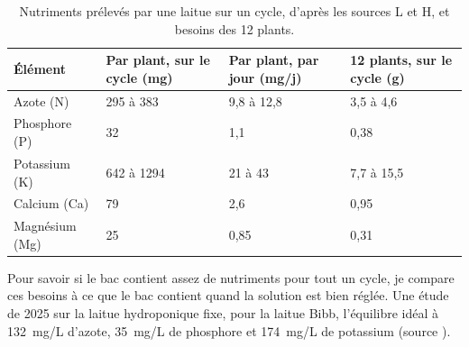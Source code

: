 \begin{table}[H]
\centering
\small
\renewcommand{\arraystretch}{1.1}
\begin{tabularx}{\textwidth}{|>{\raggedright\arraybackslash}p{2.6cm}|Y|Y|Y|}
\hline
\textbf{Élément} & \textbf{Par plant, sur le cycle (\unit{mg})} & \textbf{Par plant, par jour (\unit{mg/j})} & \textbf{12 plants, sur le cycle (\unit{g})} \\
\hline
Azote (N) & 295 à 383 & 9,8 à 12,8 & 3,5 à 4,6 \\
\hline
Phosphore (P) & 32 & 1,1 & 0,38 \\
\hline
Potassium (K) & 642 à 1294 & 21 à 43 & 7,7 à 15,5 \\
\hline
Calcium (Ca) & 79 & 2,6 & 0,95 \\
\hline
Magnésium (Mg) & 25 & 0,85 & 0,31 \\
\hline
\end{tabularx}
\caption{Nutriments prélevés par une laitue sur un cycle, d'après les sources L et H, et besoins des 12 plants.}
\end{table}

Pour savoir si le bac contient assez de nutriments pour tout un cycle, je compare ces besoins à ce que le bac contient quand la solution est bien réglée. Une étude de 2025 sur la laitue hydroponique fixe, pour la laitue Bibb, l'équilibre idéal à \qty{132}{mg/L} d'azote, \qty{35}{mg/L} de phosphore et \qty{174}{mg/L} de potassium (source ).

